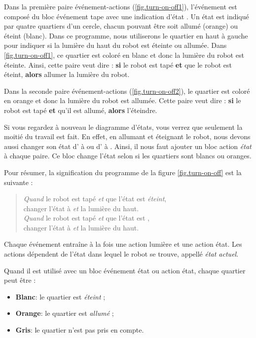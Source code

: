 Dans la première paire événement-actions (\cref{fig.turn-on-off1}), l'événement est composé du bloc événement tape avec une indication d'état .
Un état est indiqué par quatre quartiers d'un cercle, chacun pouvant être soit allumé (orange) ou éteint (blanc).
Dans ce programme, nous utiliserons le quartier en haut à gauche pour indiquer si la lumière du haut du robot est éteinte ou allumée.
Dans \cref{fig.turn-on-off1}, ce quartier est coloré en blanc
et donc la lumière du robot est éteinte.
Ainsi, cette paire veut dire : \textbf{si} le robot est tapé \textbf{et} que le robot est éteint, \textbf{alors} allumer la lumière du robot.

Dans la seconde paire événement-actions
(\cref{fig.turn-on-off2}),
le quartier est coloré en orange et donc la lumière du robot est allumée.
Cette paire veut dire : \textbf{si} le robot est tapé \textbf{et} qu'il est allumé, \textbf{alors} l'éteindre.

Si vous regardez à nouveau le diagramme d'états, vous verrez que seulement la moitié du travail est fait.
En effet, en allumant et éteignant le robot, nous devons aussi changer son état d' à  ou d' à .
Ainsi, il nous faut ajouter un bloc action \emph{état}  à chaque paire.
Ce bloc change l'état selon si les quartiers sont blancs ou oranges.

Pour résumer, la signification du programme de la figure \cref{fig.turn-on-off} est la suivante :

\begin{quote}
    \emph{Quand} le robot est tapé \emph{et} que l'état est \emph{éteint},\\ changer l'état à  \emph{et}  la lumière du haut.\\
    \emph{Quand} le robot est tapé \emph{et} que l'état est ,\\changer l'état à 
    \emph{et}  la lumière du haut.
\end{quote}

Chaque événement entraîne à la fois une action lumière et une action état.
Les actions dépendent de l'état dans lequel le robot se trouve, appellé \emph{état actuel}.


Quand il est utilisé avec un bloc événement état ou action état, chaque quartier peut être :
\begin{itemize}
	\item \textbf{Blanc}: le quartier est \emph{éteint} ;
	\item \textbf{Orange}: le quartier est \emph{allumé} ;
	\item \textbf{Gris}: le quartier n'est pas pris en compte.
\end{itemize}

